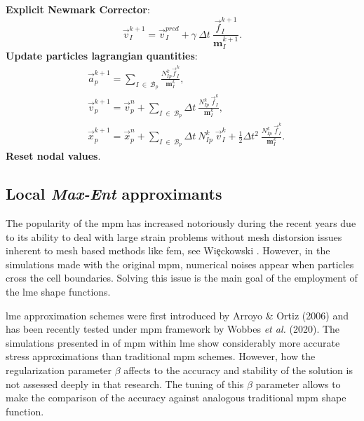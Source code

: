 \documentclass[preprint,12pt,a4paper]{elsarticle}
\newcommand{\tens}[1]{
  \ensuremath{\mathbf{{#1}}}
}
\begin{document}
\begin{algorithm}
\begin{algorithmic}[1]
    \STATE \textbf{Explicit Newmark Corrector}:
    \begin{equation*}
      \vec{v}_{I}^{k+1} = \vec{v}_{I}^{pred} + \gamma\ \Delta t\ \frac{\vec{f}_{I}^{k+1}}{\tens{m}_I^{k+1}}.
    \end{equation*}
    \STATE \textbf{Update particles lagrangian quantities}:
    \begin{align*}
      &\vec{a}_p^{k+1} = \sum_{I\ \in\ \mathcal{B}_p} \frac{N_{Ip}^k\vec{f}_{I}^{k}}{\tens{m}_I^k},\\
      &\vec{v}_p^{k+1} = \vec{v}_p^n + \sum_{I\ \in\ \mathcal{B}_p} \Delta t\
        \frac{N_{Ip}^k\
        \vec{f}_{I}^{k}}{\tens{m}_I^k},\\
      &\vec{x}_p^{k+1} = \vec{x}_p^n + \sum_{I\ \in\ \mathcal{B}_p} \Delta t\
         N_{Ip}^k\ \vec{v}_{I}^{k} +
        \frac{1}{2}\Delta t^2\ \frac{N_{Ip}^k\
        \vec{f}_{I}^{k}}{\tens{m}_I^k}.
    \end{align*}
    \STATE \textbf{Reset nodal values}.
  \end{algorithmic}
\end{algorithm}

\subsection{Local \textit{Max-Ent} approximants}
\label{sec:local-max-ent}
The popularity of the \acrshort{mpm} has increased notoriously during
the recent years due to its ability to deal with large strain problems
without mesh distorsion issues inherent to mesh based methods like
\acrshort{fem}, see Wi{\c{e}}ckowski \cite{Wieckowski2004}. However, in the simulations
made with the original \acrshort{mpm}, numerical noises appear when particles
cross the cell boundaries. Solving this issue is the main goal of the employment of the \acrshort{lme} shape functions.

\acrfull{lme} approximation schemes were
first introduced by Arroyo \& Ortiz (2006)\cite{Arroyo2006} and has been
recently tested under \acrshort{mpm} framework by Wobbes {\it et al.}
(2020)\cite{Wobbes2020}. The simulations presented in \cite{Wobbes2020} of \acrshort{mpm}
within \acrshort{lme} show considerably more accurate stress
approximations than traditional \acrshort{mpm} schemes. However, 
how the regularization parameter $\beta$ affects to the accuracy and
stability of the solution is not assessed deeply in that research. The tuning of this $\beta$ parameter allows to make the comparison of the accuracy against analogous traditional \acrshort{mpm} shape function.
\end{document}
